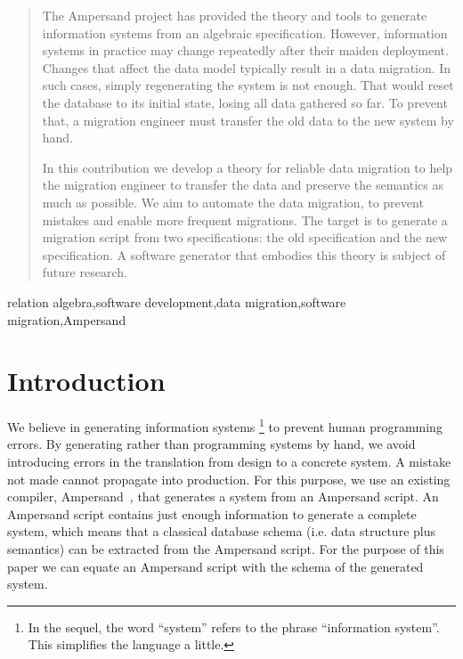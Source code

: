 \documentclass{elsarticle}
\begin{document}
\begin{abstract}
   The Ampersand project has provided the theory and tools to generate information systems from an algebraic specification.
   However, information systems in practice may change repeatedly after their maiden deployment.
   Changes that affect the data model typically result in a data migration.
   In such cases, simply regenerating the system is not enough.
   That would reset the database to its initial state, losing all data gathered so far.
   To prevent that, a migration engineer must transfer the old data to the new system by hand.

   In this contribution we develop a theory for reliable data migration to help the migration engineer
   to transfer the data and preserve the semantics as much as possible.
   We aim to automate the data migration,
   to prevent mistakes and enable more frequent migrations.
   The target is to generate a migration script from two specifications: the old specification and the new specification.
   A software generator that embodies this theory is subject of future research.
\end{abstract}

\begin{keyword}
relation algebra\sep software development\sep data migration\sep software migration\sep Ampersand
\end{keyword}
\maketitle

\section{Introduction}
\label{sct:Introduction}
   We believe in generating information systems%
\footnote{In the sequel, the word ``system'' refers to the phrase ``information system''. This simplifies the language a little. }
   to prevent human programming errors.
   By generating rather than programming systems by hand,
   we avoid introducing errors in the translation from design to a concrete system.
   A mistake not made cannot propagate into production.
   For this purpose, we use an existing compiler, Ampersand~\cite{Joosten-JLAMP2018},
   that generates a system from an Ampersand script.
   An Ampersand script contains just enough information to generate a complete system,
   which means that a classical database schema (i.e. data structure plus semantics) can be extracted from the Ampersand script.
   For the purpose of this paper we can equate an Ampersand script with the schema of the generated system.
\end{document}
